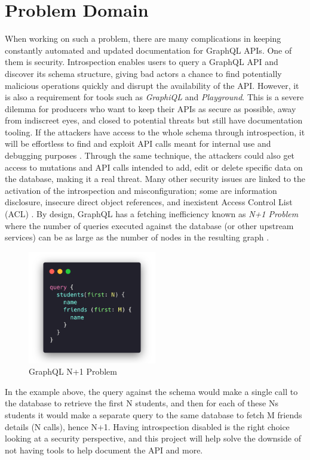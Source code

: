 \section*{Problem Domain}
\label{s:Problem-Domain}
When working on such a problem, there are many complications in keeping
constantly automated and updated documentation for GraphQL APIs. One of them is
security. Introspection enables users to query a GraphQL API and discover its
schema structure, giving bad actors a chance to find potentially malicious
operations \citep{khalilWhyYouShould2021} quickly and disrupt the availability
of the API. However, it is also a requirement for tools such as
\textit{GraphiQL} and \textit{Playground}. This is a severe dilemma for
producers who want to keep their APIs as secure as possible, away from
indiscreet eyes, and closed to potential threats but still have documentation
tooling. If the attackers have access to the whole schema through introspection,
it will be effortless to find and exploit API calls meant for internal use and
debugging purposes \citep{rizwanGraphQLCommonVulnerabilities2021}. Through the
same technique, the attackers could also get access to mutations and API calls
intended to add, edit or delete specific data on the database, making it a real
threat. Many other security issues are linked to the activation of the
introspection and misconfiguration; some are information disclosure, insecure
direct object references, and inexistent Access Control List (ACL) \citep{
yeswehackHowExploitGraphQL2021}. By design, GraphQL has a fetching inefficiency
known as \textit{N+1 Problem} where the number of queries executed against the
database (or other upstream services) can be as large as the number of nodes in
the resulting graph \citep{ graphqlbypopSuppressingProblemGraphQL2020}.
\begin{figure}[H]
  \centering
  \includegraphics[width=0.5\textwidth]{figures/code/n+1}
  \caption{GraphQL N+1 Problem}
  \label{f:Proposal-GraphQL-N1-Problem}
\end{figure}
In the example above, the query against the schema would make a single call to
the database to retrieve the first N students, and then for each of these Ns
students it would make a separate query to the same database to fetch M friends
details (N calls), hence N+1. Having introspection disabled is the right choice
looking at a security perspective, and this project will help solve the downside
of not having tools to help document the API and more.

